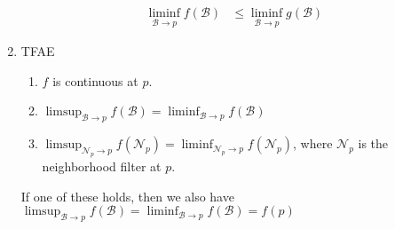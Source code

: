 \documentclass{treatise}
\begin{document}
\begin{proposition}
\begin{enumerate}
\begin{align*}
        \\
        \liminf_{\mathcal{B} \to p} f(\mathcal{B}) & \leq \liminf_{\mathcal{B} \to p} g(\mathcal{B})
    \end{align*}
    \item TFAE
    \begin{enumerate}
        \item $f$ is continuous at $p$.
        \item $\limsup_{\mathcal{B} \to p} f(\mathcal{B}) = \liminf_{\mathcal{B} \to p} f(\mathcal{B})$
        \item $\limsup_{\mathcal{N}_p \to p} f(\mathcal{N}_p) = \liminf_{\mathcal{N}_p \to p} f(\mathcal{N}_p)$, where $\mathcal{N}_p$ is the neighborhood filter at $p$.
    \end{enumerate}
    If one of these holds, then we also have $\limsup_{\mathcal{B} \to p} f(\mathcal{B}) = \liminf_{\mathcal{B} \to p} f(\mathcal{B}) = f(p)$
\end{enumerate}
\end{proposition}
\end{document}
